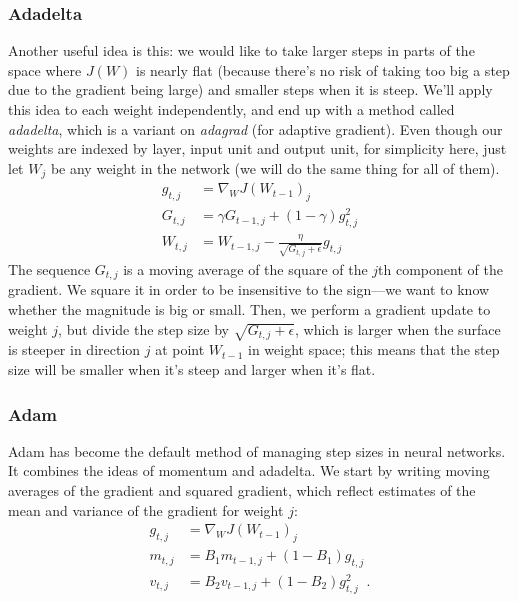 \subsubsection{Adadelta}
Another useful idea is this:  we would like to take larger steps in
parts of the space where $J(W)$ is nearly flat (because there's no risk of
taking too big a step due to the gradient being large) and smaller
steps when it is steep.  We'll apply this idea to each weight
independently, and end up with a method called {\em adadelta}, which
is a variant on {\em adagrad} (for
adaptive gradient).   Even though our weights are indexed by layer,
input unit and output unit,  for simplicity here,  just let $W_j$ be
any weight in the network (we will do the same thing for all of
them).
\begin{align*}
  g_{t,j} & = \nabla_W J(W_{t-1})_j                                      \\
  G_{t,j} & = \gamma G_{t - 1,j} + (1 - \gamma)g_{t,j}^2                 \\
  W_{t,j} & = W_{t-1, j} - \frac{\eta}{\sqrt{G_{t,j} + \epsilon}}g_{t,j}
\end{align*}
The sequence $G_{t,j}$ is a moving average of the  square of the
$j$th component of the gradient.  We square it in order to be
insensitive to the sign---we want to know whether the magnitude is big
or small.  Then, we perform a gradient update to weight $j$, but
divide the step  size by $\sqrt{G_{t,j} + \epsilon}$, which is larger
when the surface is steeper in direction $j$ at point $W_{t-1}$ in
weight space;  this means that the step size will be smaller when it's
steep and  larger when it's flat.

\subsubsection{Adam}

Adam has become the default method of managing step sizes in neural
networks.   It combines the ideas  of
momentum and adadelta.  We start by writing moving averages of the
gradient and squared gradient, which reflect estimates of the mean and
variance of the gradient for weight $j$:
\begin{align*}
  g_{t,j} & = \nabla_W J(W_{t-1})_j                      \\
  m_{t,j} & = B_1m_{t - 1,j} + (1 - B_1)g_{t,j}          \\
  v_{t,j} & = B_2v_{t - 1,j} + (1 - B_2)g_{t,j}^2  \;\;.
\end{align*}

